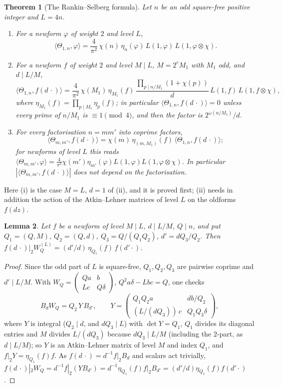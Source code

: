 ﻿\documentclass[11pt]{amsart}
\newtheorem{theorem}{Theorem}[section]
\newtheorem{lemma}[theorem]{Lemma}
\theoremstyle{remark}
\begin{document}
\begin{theorem}[The Rankin--Selberg formula]\label{thm:RS}
Let $n$ be an odd square-free positive integer and $L=4n$.
\begin{enumerate}[label=\textup{(\roman*)},leftmargin=2.2em]
\item For a newform $\varphi$ of weight $2$ and level $L$,
\[
\langle\Theta_{1,n},\varphi\rangle=\frac4{\pi^2}\,\chi(n)\,\eta_n(\varphi)\,L(1,\varphi)\,L(1,\varphi\otimes\chi).
\]
\item For a newform $f$ of weight $2$ and level $M\mid L$, $M=2^eM_1$ with $M_1$ odd, and $d\mid L/M$,
\[
\langle\Theta_{1,n},f(d\,\cdot)\rangle=\frac4{\pi^2}\,\chi(M_1)\,\eta_{M_1}(f)\,\frac{\prod_{p\mid n/M_1}(1+\chi(p))}{d}\,L(1,f)\,L(1,f\otimes\chi),
\]
where $\eta_{M_1}(f)=\prod_{p\mid M_1}\eta_p(f)$; in particular $\langle\Theta_{1,n},f(d\,\cdot)\rangle=0$ unless every prime of $n/M_1$ is $\equiv1\pmod4$, and then the factor is $2^{\omega(n/M_1)}/d$.
\item For every factorisation $n=mm'$ into coprime factors,
\[
\langle\Theta_{m,m'},f(d\,\cdot)\rangle=\chi(m)\,\eta_{(m,M_1)}(f)\,\langle\Theta_{1,n},f(d\,\cdot)\rangle;
\]
for newforms of level $L$ this reads $\langle\Theta_{m,m'},\varphi\rangle=\frac4{\pi^2}\chi(m')\eta_{m'}(\varphi)L(1,\varphi)L(1,\varphi\otimes\chi)$. In particular $|\langle\Theta_{m,m'},f(d\,\cdot)\rangle|$ does not depend on the factorisation.
\end{enumerate}
\end{theorem}

Here (i) is the case $M=L$, $d=1$ of (ii), and it is proved first; (ii) needs in addition the action of the Atkin--Lehner matrices of level $L$ on the oldforms $f(dz)$.

\begin{lemma}\label{lem:ALold}
Let $f$ be a newform of level $M\mid L$, $d\mid L/M$, $Q\mid n$, and put $Q_1=(Q,M)$, $Q_2=(Q,d)$, $Q_3=Q/(Q_1Q_2)$, $d'=dQ_3/Q_2$. Then $f(d\,\cdot)|_2W_Q^{(L)}=(d'/d)\,\eta_{Q_1}(f)\,f(d'\cdot)$.
\end{lemma}
\begin{proof}
Since the odd part of $L$ is square-free, $Q_1,Q_2,Q_3$ are pairwise coprime and $d'\mid L/M$. With $W_Q=\left(\begin{smallmatrix}Qa&b\\Lc&Q\delta\end{smallmatrix}\right)$, $Q^2a\delta-Lbc=Q$, one checks
\[
B_dW_Q=Q_2\,Y\,B_{d'},\qquad Y=\begin{pmatrix}Q_1Q_2a&db/Q_2\\ (L/(dQ_3))\,c&Q_1Q_3\delta\end{pmatrix},
\]
where $Y$ is integral ($Q_2\mid d$, and $dQ_3\mid L$) with $\det Y=Q_1$, $Q_1$ divides its diagonal entries and $M$ divides $L/(dQ_3)$ because $dQ_3\mid L/M$ (including the $2$-part, as $d\mid L/M$); so $Y$ is an Atkin--Lehner matrix of level $M$ and index $Q_1$, and $f|_2Y=\eta_{Q_1}(f)f$. As $f(d\,\cdot)=d^{-1}f|_2B_d$ and scalars act trivially, $f(d\,\cdot)|_2W_Q=d^{-1}f|_2(YB_{d'})=d^{-1}\eta_{Q_1}(f)f|_2B_{d'}=(d'/d)\eta_{Q_1}(f)f(d'\cdot)$.
\end{proof}
\end{document}

